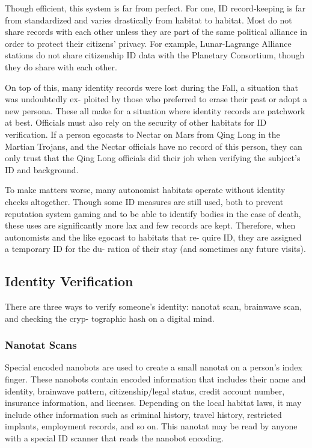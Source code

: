 Though efficient, this system is far from perfect. For 
one, ID record-keeping is far from standardized and 
varies drastically from habitat to habitat. Most do not 
share records with each other unless they are part of the 
same political alliance in order to protect their citizens' 
privacy. For example, Lunar-Lagrange Alliance stations 
do not share citizenship ID data with the Planetary 
Consortium, though they do share with each other. 

On top of this, many identity records were lost 
during the Fall, a situation that was undoubtedly ex-
ploited by those who preferred to erase their past or 
adopt a new persona. These all make for a situation 
where identity records are patchwork at best. Officials 
must also rely on the security of other habitats for ID 
verification. If a person egocasts to Nectar on Mars 
from Qing Long in the Martian Trojans, and the 
Nectar officials have no record of this person, they 
can only trust that the Qing Long officials did their 
job when verifying the subject's ID and background.

To make matters worse, many autonomist habitats 
operate without identity checks altogether. Though 
some ID measures are still used, both to prevent 
reputation system gaming and to be able to identify 
bodies in the case of death, these uses are significantly 
more lax and few records are kept. Therefore, when 
autonomists and the like egocast to habitats that re-
quire ID, they are assigned a temporary ID for the du-
ration of their stay (and sometimes any future visits).

\subsection{Identity Verification}

There are three ways to verify someone's identity: 
nanotat scan, brainwave scan, and checking the cryp-
tographic hash on a digital mind.

\subsubsection{Nanotat Scans}

Special encoded nanobots are used to create a small 
nanotat on a person's index finger. These  nanobots 
contain encoded information that includes their name 
and identity, brainwave pattern, citizenship/legal status, 
credit account number, insurance information, and 
licenses. Depending on the local habitat laws, it may 
include other information such as criminal history, 
travel history, restricted implants, employment records, 
and so on. This nanotat may be read by anyone with 
a special ID scanner that reads the nanobot encoding.

